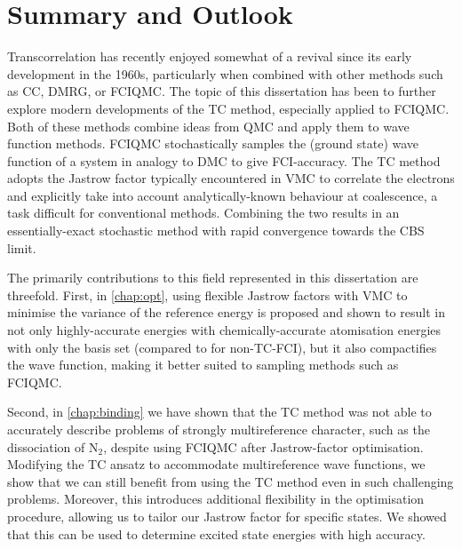 \chapter{Summary and Outlook}
  \label{chap:sumandout}

Transcorrelation has recently enjoyed somewhat of a revival since its early development in the 1960s, particularly when combined with other methods such as \gls{CC}, \gls{DMRG}, or \gls{FCIQMC}. The topic of this dissertation has been to further explore modern developments of the \gls{TC} method, especially applied to FCIQMC. Both of these methods combine ideas from \gls{QMC} and apply them to wave function methods. FCIQMC stochastically samples the (ground state) wave function of a system in analogy to \gls{DMC} to give \gls{FCI}-accuracy. The TC method adopts the Jastrow factor typically encountered in \gls{VMC} to correlate the electrons and explicitly take into account analytically-known behaviour at coalescence, a task difficult for conventional methods. Combining the two results in an essentially-exact stochastic method with rapid convergence towards the \gls{CBS} limit.

The primarily contributions to this field represented in this dissertation are threefold. First, in \autoref{chap:opt}, using flexible Jastrow factors with VMC to minimise the variance of the reference energy is proposed and shown to result in not only highly-accurate energies with chemically-accurate atomisation energies with only the \vtz basis set (compared to  for non-TC-FCI), but it also compactifies the wave function, making it better suited to sampling methods such as FCIQMC.

Second, in \autoref{chap:binding} we have shown that the TC method was not able to accurately describe problems of strongly multireference character, such as the dissociation of N$_2$, despite using FCIQMC after Jastrow-factor optimisation. Modifying the TC ansatz to accommodate multireference wave functions, we show that we can still benefit from using the TC method even in such challenging problems. Moreover, this introduces additional flexibility in the optimisation procedure, allowing us to tailor our Jastrow factor for specific states. We showed that this can be used to determine excited state energies with high accuracy.

